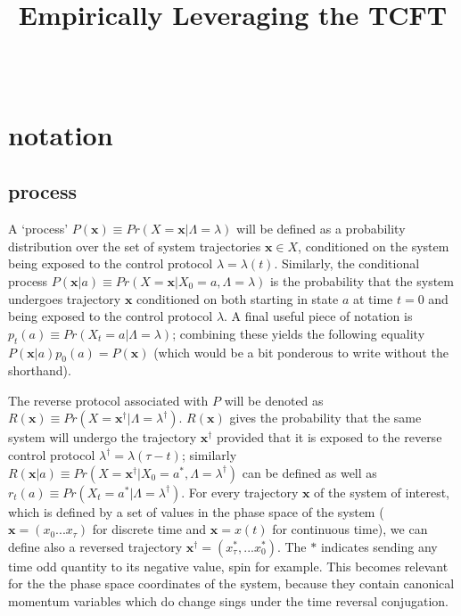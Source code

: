 \documentclass[paper=a4, fontsize=10pt]{article} %
\title{	
\normalfont \normalsize 
\horrule{.5pt}\\ %
\Large Empirically Leveraging the TCFT\\ 
\horrule{1pt}\\ %
}
\author{}
\date{\normalsize}%
\numberwithin{equation}{section} %
\numberwithin{figure}{section} %
\numberwithin{table}{section} %
\def \x {\mathbf{x} }
\begin{document}
 

\maketitle %
\section{notation}

\subsection{process}
A `process' $P(\x) \equiv Pr(X=\x|\Lambda=\lambda)$ will be defined as a probability distribution over the set of system trajectories $\x \in X$, conditioned on the system being exposed to the control protocol $\lambda = \lambda(t)$. Similarly, the conditional process $P(\x|a) \equiv Pr(X=\x|X_0=a, \Lambda=\lambda)$ is the probability that the system undergoes trajectory $\x$ conditioned on both starting in state $a$ at time $t=0$ and being exposed to the control protocol $\lambda$. A final useful piece of notation is $p_t(a) \equiv Pr(X_t=a |\Lambda=\lambda)$; combining these yields the following equality $P(\x|a)p_0(a) = P(\x)$ (which would be a bit ponderous to write without the shorthand). 

The reverse protocol associated with $P$ will be denoted as $R(\x) \equiv Pr(X=\x^\dagger|\Lambda=\lambda^{\dagger})$. $R(\x)$ gives the probability that the same system will undergo the trajectory $\x^\dagger$ provided that it is exposed to the reverse control protocol $\lambda^{\dagger}= \lambda(\tau-t)$; similarly $R(\x|a) \equiv Pr(X=\x^\dagger|X_0=a^*, \Lambda=\lambda^\dagger)$ can be defined as well as $r_t(a) \equiv Pr(X_t=a^* |\Lambda=\lambda^\dagger)$. For every trajectory $\x$ of the system of interest, which is defined by a set of values in the phase space of the system ($\x = (x_0 ... x_\tau)$ for discrete time and $\x= x(t)$ for continuous time), we can define also a reversed trajectory $\x^{\dagger} = (x_\tau^*, ... x_0^*)$. The $*$ indicates sending any time odd quantity to its negative value, spin for example. This becomes relevant for the the phase space coordinates of the system, because they contain canonical momentum variables which do change sings under the time reversal conjugation. 
\end{document}
